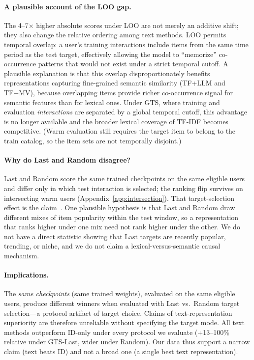 \documentclass[sigconf,natbib=true,anonymous]{acmart}
\newcommand{\tfidf}{\textsc{TF-IDF}\xspace}
\newcommand{\tfllm}{\textsc{TF+LLM}\xspace}
\newcommand{\tfmv}{\textsc{TF+MV}\xspace}
\begin{document}
\paragraph{A plausible account of the LOO gap.}
The 4--7$\times$ higher absolute scores under LOO are not merely an additive shift; they also change the relative ordering among text methods.
LOO permits temporal overlap: a user's training interactions include items from the same time period as the test target, effectively allowing the model to ``memorize'' co-occurrence patterns that would not exist under a strict temporal cutoff.
A plausible explanation is that this overlap disproportionately benefits representations capturing fine-grained semantic similarity (\tfllm and \tfmv), because overlapping items provide richer co-occurrence signal for semantic features than for lexical ones.
Under GTS, where training and evaluation \emph{interactions} are separated by a global temporal cutoff, this advantage is no longer available and the broader lexical coverage of \tfidf becomes competitive.
(Warm evaluation still requires the target item to belong to the train catalog, so the item sets are not temporally disjoint.)

\paragraph{Why do Last and Random disagree?}
Last and Random score the same trained checkpoints on the same eligible users and differ only in which test interaction is selected; the ranking flip survives on intersecting warm users (Appendix~\ref{app:intersection}).
That target-selection effect is the claim~\cite{gusak2025time}.
One plausible hypothesis is that Last and Random draw different mixes of item popularity within the test window, so a representation that ranks higher under one mix need not rank higher under the other.
We do not have a direct statistic showing that Last targets are recently popular, trending, or niche, and we do not claim a lexical-versus-semantic causal mechanism.

\paragraph{Implications.}
The \emph{same checkpoints} (same trained weights), evaluated on the same eligible users, produce different winners when evaluated with Last vs.\ Random target selection---a protocol artifact of target choice.
Claims of text-representation superiority are therefore unreliable without specifying the target mode.
All text methods outperform ID-only under every protocol we evaluate ($+$13--100\% relative under GTS-Last, wider under Random).
Our data thus support a narrow claim (text beats ID) and not a broad one (a single best text representation).
\end{document}
